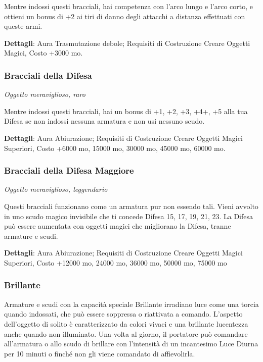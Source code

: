\begin{multicols}{2}
	Mentre indossi questi bracciali, hai competenza con l'arco lungo e l'arco corto, e ottieni un bonus di +2 ai tiri di danno degli attacchi a distanza effettuati con queste armi.

	\textbf{Dettagli}: Aura Trasmutazione debole; Requisiti di Costruzione Creare Oggetti Magici, Costo +3000 mo.

	\subsubsection*{Bracciali della Difesa}
	\textit{Oggetto meraviglioso, raro}

	Mentre indossi questi bracciali, hai un bonus di +1, +2, +3, +4+, +5 alla tua Difesa se non indossi nessuna armatura e non usi nessuno scudo.

	\textbf{Dettagli}: Aura Abiurazione; Requisiti di Costruzione Creare Oggetti Magici Superiori, Costo +6000 mo, 15000 mo, 30000 mo, 45000 mo, 60000 mo.

	\subsubsection*{Bracciali della Difesa Maggiore}
	\textit{Oggetto meraviglioso, leggendario}

	Questi bracciali funzionano come un armatura pur non essendo tali. Vieni avvolto in uno scudo magico invisibile che ti concede Difesa 15, 17, 19, 21, 23. La Difesa può essere aumentata con oggetti magici che migliorano la Difesa, tranne armature e scudi.

	\textbf{Dettagli}: Aura Abiurazione; Requisiti di Costruzione Creare Oggetti Magici Superiori, Costo +12000 mo, 24000 mo, 36000 mo, 50000 mo, 75000 mo


	\subsubsection*{Brillante}

	Armature e scudi con la capacità speciale Brillante irradiano luce come una torcia quando indossati, che può essere soppressa o riattivata a comando. L'aspetto dell'oggetto di solito è caratterizzato da colori vivaci e una brillante lucentezza anche quando non illuminato. Una volta al giorno, il portatore può comandare all'armatura o allo scudo di brillare con l'intensità di un incantesimo Luce Diurna per 10 minuti o finché non gli viene comandato di affievolirla.


\end{multicols}

